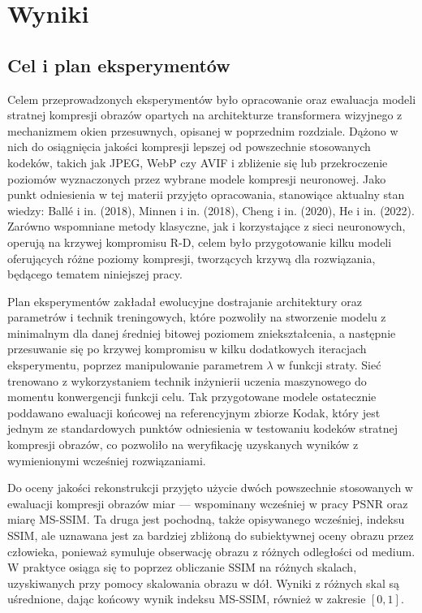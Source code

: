 \clearpage
\section{Wyniki}
\subsection{Cel i plan eksperymentów} \label{cel-eksperymentow}
Celem przeprowadzonych eksperymentów było opracowanie oraz ewaluacja modeli stratnej kompresji obrazów opartych na architekturze transformera wizyjnego z mechanizmem okien przesuwnych, opisanej w poprzednim rozdziale. Dążono w nich do osiągnięcia jakości kompresji lepszej od powszechnie stosowanych kodeków, takich jak JPEG, WebP czy AVIF i zbliżenie się lub przekroczenie poziomów wyznaczonych przez wybrane modele kompresji neuronowej. Jako punkt odniesienia w tej materii przyjęto opracowania, stanowiące aktualny stan wiedzy: Ballé i in. (2018)\cite{balle2018variationalimagecompressionscale}, Minnen i in. (2018)\cite{minnen2018jointautoregressivehierarchicalpriors}, Cheng i in. (2020)\cite{cheng2020learnedimagecompressiondiscretized}, He i in. (2022)\cite{he2022elicefficientlearnedimage}. Zarówno wspomniane metody klasyczne, jak i korzystające z sieci neuronowych, operują na krzywej kompromisu R-D, celem było przygotowanie kilku modeli oferujących różne poziomy kompresji, tworzących krzywą dla rozwiązania, będącego tematem niniejszej pracy.

Plan eksperymentów zakładał ewolucyjne dostrajanie architektury oraz parametrów i technik treningowych, które pozwoliły na stworzenie modelu z minimalnym dla danej średniej bitowej poziomem zniekształcenia, a następnie przesuwanie się po krzywej kompromisu w kilku dodatkowych iteracjach eksperymentu, poprzez manipulowanie parametrem \( \lambda \) w funkcji straty. Sieć trenowano z wykorzystaniem technik inżynierii uczenia maszynowego do momentu konwergencji funkcji celu. Tak przygotowane modele ostatecznie poddawano ewaluacji końcowej na referencyjnym zbiorze Kodak, który jest jednym ze standardowych punktów odniesienia w testowaniu kodeków stratnej kompresji obrazów, co pozwoliło na weryfikację uzyskanych wyników z wymienionymi wcześniej rozwiązaniami.

\begin{sloppypar}
Do oceny jakości rekonstrukcji przyjęto użycie dwóch powszechnie stosowanych w ewaluacji kompresji obrazów miar --- wspominany wcześniej w pracy PSNR oraz miarę MS-SSIM\cite{wangmsssim}. Ta druga jest pochodną, także opisywanego wcześniej, indeksu SSIM, ale uznawana jest za bardziej zbliżoną do subiektywnej oceny obrazu przez człowieka, ponieważ symuluje obserwację obrazu z różnych odległości od medium. W praktyce osiąga się to poprzez obliczanie SSIM na różnych skalach, uzyskiwanych przy pomocy skalowania obrazu w dół. Wyniki z różnych skal są uśrednione, dając końcowy wynik indeksu MS-SSIM, również w zakresie \( \left[ 0, 1 \right] \).
\end{sloppypar}
